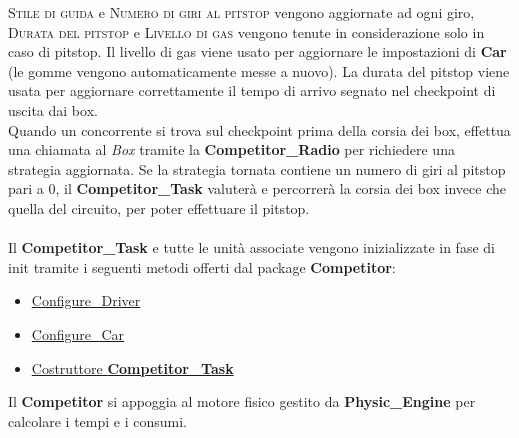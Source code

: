 \textsc{Stile di guida} e \textsc{Numero di giri al pitstop} vengono aggiornate ad ogni giro, \textsc{Durata del pitstop}
e \textsc{Livello di gas} vengono tenute in considerazione solo in caso di pitstop. Il livello di gas viene usato per aggiornare
le impostazioni di \textbf{Car} (le gomme vengono automaticamente messe a nuovo). 
La durata del pitstop viene usata per aggiornare correttamente il tempo di arrivo segnato nel checkpoint di uscita
dai box.\\
Quando un concorrente si trova sul checkpoint prima della corsia dei box, effettua una chiamata al \emph{Box} tramite la \textbf{Competitor\_Radio}
per richiedere una strategia aggiornata. Se la strategia tornata contiene un numero di giri al pitstop pari a 0, il \textbf{Competitor\_Task}
valuter\`{a} e percorrer\`{a} la corsia dei box invece che quella del circuito, per poter effettuare il pitstop.\\\\
Il \textbf{Competitor\_Task} e tutte le unit\`{a} associate vengono inizializzate in fase di init tramite i seguenti metodi offerti dal package
\textbf{Competitor}:
\begin{itemize}
\item \underline{Configure\_Driver}
\item \underline{Configure\_Car}
\item \underline{Costruttore \textbf{Competitor\_Task}}
\end{itemize}
Il \textbf{Competitor} si appoggia al motore fisico gestito da \textbf{Physic\_Engine} per calcolare i tempi e i consumi.
\newpage
